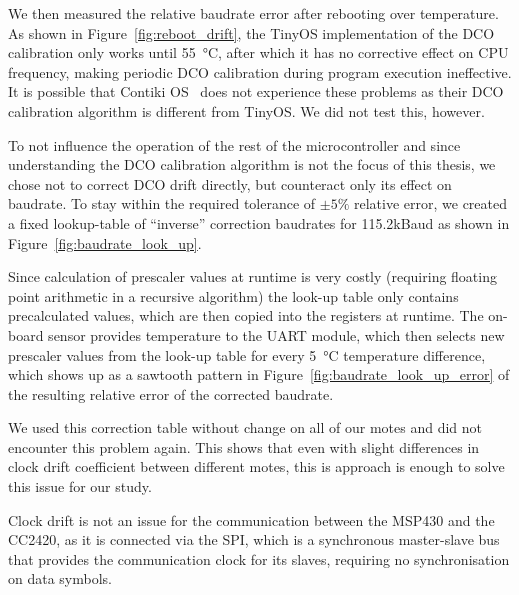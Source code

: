 We then measured the relative baudrate error after rebooting over temperature.
As shown in Figure~\ref{fig:reboot_drift}, the TinyOS implementation of the \ac{DCO} calibration only works until \SI{55}{\celsius}, after which it has no corrective effect on CPU frequency, making periodic \ac{DCO} calibration during program execution ineffective.
It is possible that Contiki OS~\cite{contiki-os.org} does not experience these problems as their \ac{DCO} calibration algorithm is different from TinyOS. We did not test this, however.

To not influence the operation of the rest of the microcontroller and since understanding the \ac{DCO} calibration algorithm is not the focus of this thesis, we chose not to correct \ac{DCO} drift directly, but counteract only its effect on baudrate.
To stay within the required tolerance of $\pm5\%$ relative error, we created a fixed lookup-table of ``inverse'' correction baudrates for 115.2kBaud as shown in Figure~\ref{fig:baudrate_look_up}.

Since calculation of prescaler values at runtime is very costly (requiring floating point arithmetic in a recursive algorithm) the look-up table only contains precalculated values, which are then copied into the registers at runtime.
The on-board sensor provides temperature to the \ac{UART} module, which then selects new prescaler values from the look-up table for every \SI{5}{\celsius} temperature difference, which shows up as a sawtooth pattern in Figure~\ref{fig:baudrate_look_up_error} of the resulting relative error of the corrected baudrate.

We used this correction table without change on all of our motes and did not encounter this problem again.
This shows that even with slight differences in clock drift coefficient between different motes, this is approach is enough to solve this issue for our study.

Clock drift is not an issue for the communication between the MSP430 and the CC2420, as it is connected via the \ac{SPI}, which is a synchronous master-slave bus that provides the communication clock for its slaves, requiring no synchronisation on data symbols.
